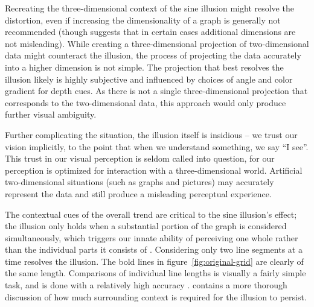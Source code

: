 \documentclass[12pt]{article}\usepackage[]{graphicx}\usepackage[]{color}
\begin{document}
Recreating the three-dimensional context of the sine illusion might resolve the distortion, even if increasing the dimensionality of a graph is generally not recommended \citep{tufte, cleveland:1984} (though \citet{spence:1990} suggests that in certain cases additional dimensions are not misleading). While creating a three-dimensional projection of two-dimensional data might counteract the illusion, the process of projecting the data accurately into a higher dimension is not simple. The projection that best resolves the illusion likely is highly subjective and influenced by choices of angle and color gradient for depth cues. As there is not a single three-dimensional projection that corresponds to the two-dimensional data, this approach would only produce further visual ambiguity.

Further complicating the situation, the illusion itself is insidious -- we trust our vision implicitly, to the point that when we understand something, we say ``I see''. This trust in our visual perception is seldom called into question, for our perception is optimized for interaction with a three-dimensional world. Artificial two-dimensional situations (such as graphs and pictures) may accurately represent the data and still produce a misleading perceptual experience.

The contextual cues of the overall trend are critical to the sine illusion's effect;  the illusion  only  holds when a substantial portion of the graph is considered simultaneously, which triggers our innate ability of perceiving one whole rather than the individual parts it consists of \citep[principle of grouping; ][]{wolfe2012sensation}.
Considering only two line segments at a time resolves the illusion. The bold lines in figure~\ref{fig:original-grid} are clearly of the same length.  Comparisons of individual line lengths is visually a fairly simple task, and is done with a relatively high accuracy \citep{cleveland:1984}. \citet{day:1991} contains a more thorough discussion of how much surrounding context is required for the illusion to persist. 
\end{document}

